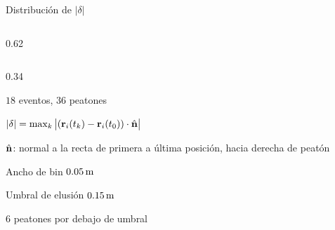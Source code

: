\begin{frame}{Distribución de $|\delta|$}
  \begin{cols}
    \begin{column}{0.62\textwidth}
    \end{column}
    \begin{column}{0.34\textwidth}
      \begin{parametros}
        \item $18$ eventos, $36$ peatones
        \item $|\delta| = \max_k \big|(\mathbf{r}_i(t_k) - \mathbf{r}_i(t_0))\cdot\hat{\mathbf{n}}\big|$
        \item $\hat{\mathbf{n}}$: normal a la recta de primera a última posición, hacia derecha de peatón
        \item Ancho de bin $0.05\,\mathrm{m}$
      \end{parametros}
      \vspace{6pt}
      \begin{resultado}
        \item Umbral de elusión $0.15\,\mathrm{m}$
        \item $6$ peatones por debajo de umbral
      \end{resultado}
    \end{column}
  \end{cols}
\end{frame}

